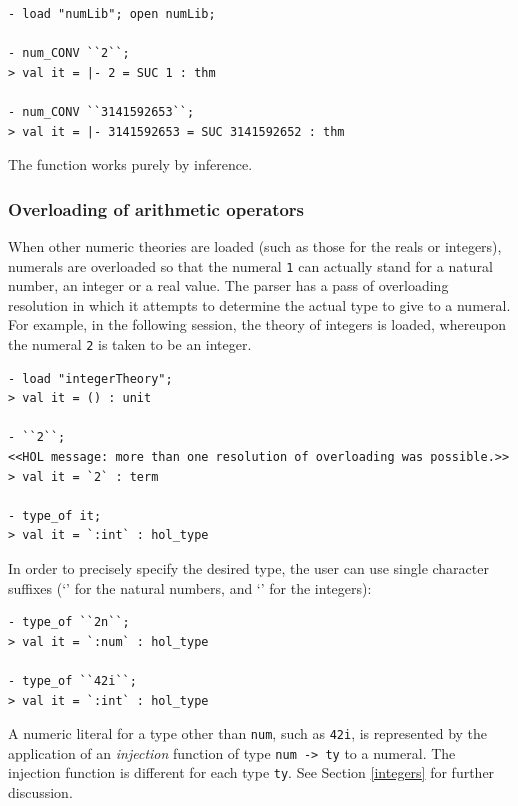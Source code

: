 \begin{session}
\begin{verbatim}
- load "numLib"; open numLib;

- num_CONV ``2``;
> val it = |- 2 = SUC 1 : thm

- num_CONV ``3141592653``;
> val it = |- 3141592653 = SUC 3141592652 : thm
\end{verbatim}
\end{session}

\noindent The  function works purely by inference.

\subsubsection{Overloading of arithmetic operators}
\label{arith-overloading}

When other numeric theories are loaded (such as those for the reals or
integers), numerals are overloaded so that the numeral {\small\verb+1+} can
actually stand for a natural number, an integer or a real value. The
parser has a pass of overloading resolution in which it attempts to
determine the actual type to give to a numeral. For example, in the
following session, the theory of integers is loaded, whereupon the
numeral \verb+2+ is taken to be an integer.
%
\begin{session}
\begin{verbatim}
- load "integerTheory";
> val it = () : unit

- ``2``;
<<HOL message: more than one resolution of overloading was possible.>>
> val it = `2` : term

- type_of it;
> val it = `:int` : hol_type
\end{verbatim}
\end{session}

 In order to precisely specify the desired type, the user can use single
character suffixes (`' for the natural numbers, and `' for
the integers):
\begin{session}
\begin{verbatim}
- type_of ``2n``;
> val it = `:num` : hol_type

- type_of ``42i``;
> val it = `:int` : hol_type
\end{verbatim}
\end{session}

A numeric literal for a \HOL{} type other than \verb+num+, such as
\verb+42i+,  is represented by the application of an
\emph{injection} function of type {\small\verb+num -> ty+} to a
numeral. The injection function is different for each type
{\small\verb+ty+}. See Section \ref{integers} for further discussion.

